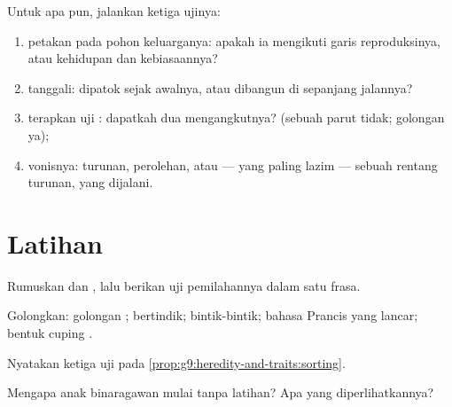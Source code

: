 \begin{method}\label{met:g9:heredity-and-traits:audit}
Untuk  apa pun, jalankan ketiga ujinya:
\begin{enumerate}
  \item petakan pada pohon keluarganya: apakah ia mengikuti
        garis reproduksinya, atau kehidupan dan kebiasaannya?
  \item tanggali: dipatok sejak awalnya, atau dibangun di
        sepanjang jalannya?
  \item terapkan uji : dapatkah dua 
        mengangkutnya? (sebuah parut tidak; golongan  ya);
  \item vonisnya: turunan, perolehan, atau --- yang paling
        lazim --- sebuah rentang turunan, yang dijalani.
\end{enumerate}
\end{method}

\section{Latihan}

\begin{exercise}[$\star$]\label{exo:g9:heredity-and-traits:1}
Rumuskan  dan , lalu berikan uji
pemilahannya dalam satu frasa.
\end{exercise}

\begin{exercise}[$\star$]\label{exo:g9:heredity-and-traits:2}
Golongkan: golongan ;  bertindik; bintik-bintik;
bahasa Prancis yang lancar; bentuk cuping .
\end{exercise}

\begin{exercise}[$\star$]\label{exo:g9:heredity-and-traits:3}
Nyatakan ketiga uji pada
\cref{prop:g9:heredity-and-traits:sorting}.
\end{exercise}

\begin{exercise}[$\star$]\label{exo:g9:heredity-and-traits:4}
Mengapa anak binaragawan mulai tanpa latihan? Apa yang
diperlihatkannya?
\end{exercise}


